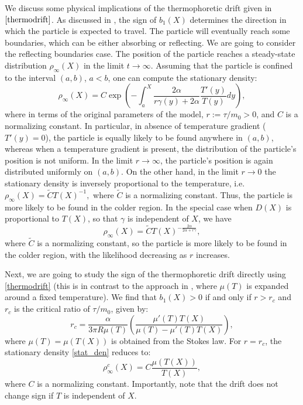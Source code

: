  We discuss some physical implications of the thermophoretic drift given in $\eqref{thermodrift}$. As discussed in \cite{Hottovy2012a}, the sign of $b_{1}(X)$ determines the direction in which
the particle is expected to travel. The particle will eventually reach some boundaries, which can be either absorbing or reflecting. We are going to consider the reflecting boundaries case. The position of the particle reaches a steady-state distribution $\rho_{\infty}(X)$ in the limit $t \to \infty$. Assuming that the particle is confined to the interval $(a,b)$, $a<b$, one can compute the stationary density:
\begin{equation} \label{stat_den}
\rho_{\infty}(X) = C \exp{\left(-\int_{a}^{X} \frac{2\alpha}{r \gamma(y) + 2\alpha} \frac{T'(y)}{T(y)} dy \right)},
\end{equation} 
where in terms of the original parameters of the model, $r := \tau/m_{0} > 0$, and $C$ is a normalizing constant. In particular, in absence of temperature gradient ($T'(y) = 0$), the particle is equally likely to be found anywhere in $(a,b)$, whereas when a temperature gradient is present, the distribution of the particle's position is not uniform. In the limit $r \to \infty$, the particle's position is again distributed uniformly on  $(a,b)$. On the other hand, in the limit $r \to 0$ the stationary density is inversely proportional to the temperature, i.e. $\rho_{\infty}(X) = \tilde{C} T(X)^{-1},$ where $\tilde{C}$ is a normalizing constant. Thus, the particle is more likely to be found in the colder region. In the special case when $D(X)$ is proportional to $T(X)$, so that $\gamma$ is independent of $X$, we have \begin{equation}\rho_{\infty}(X) = \tilde{C} T(X)^{-\frac{2\alpha}{2\alpha+r \gamma}},\end{equation}
where $\tilde{C}$ is a normalizing constant, so the particle is more likely to be found in the colder region, with the likelihood decreasing as $r$ increases.

Next, we are going to study the sign of the thermophoretic drift directly using \eqref{thermodrift} (this is in contrast to the approach in \cite{Hottovy2012a}, where $\mu(T)$ is expanded around a fixed temperature). We find that $b_{1}(X) > 0$ if and only if $r > r_c$ and $r_c$ is the critical ratio of $\tau/m_0$, given by:
\begin{equation}
r_c =  \frac{\alpha}{3 \pi R \mu(T)} \left(\frac{\mu'(T) T(X)}{\mu(T) -\mu'(T)T(X)} \right), \end{equation}
where $\mu(T) = \mu(T(X))$ is obtained from the Stokes law. 
For $r = r_c$, the stationary density \eqref{stat_den}  reduces to: \begin{equation}\rho^{c}_{\infty}(X) = C \frac{\mu(T(X))}{T(X)}, \end{equation} where $C$ is a normalizing constant. 
Importantly, note that the drift does not change sign if $T$ is independent of $X$.  
 

